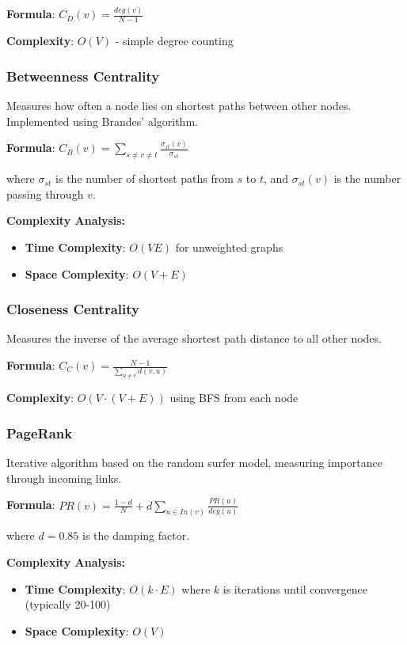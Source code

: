 \documentclass[12pt,a4paper]{article}
\begin{document}
\textbf{Formula}: $C_D(v) = \frac{deg(v)}{N-1}$

\textbf{Complexity}: $O(V)$ - simple degree counting

\subsubsection{Betweenness Centrality}
Measures how often a node lies on shortest paths between other nodes. Implemented using Brandes' algorithm.

\textbf{Formula}: $C_B(v) = \sum_{s \neq v \neq t} \frac{\sigma_{st}(v)}{\sigma_{st}}$

where $\sigma_{st}$ is the number of shortest paths from $s$ to $t$, and $\sigma_{st}(v)$ is the number passing through $v$.

\textbf{Complexity Analysis:}
\begin{itemize}
    \item \textbf{Time Complexity}: $O(VE)$ for unweighted graphs
    \item \textbf{Space Complexity}: $O(V + E)$
\end{itemize}

\subsubsection{Closeness Centrality}
Measures the inverse of the average shortest path distance to all other nodes.

\textbf{Formula}: $C_C(v) = \frac{N-1}{\sum_{u \neq v} d(v,u)}$

\textbf{Complexity}: $O(V \cdot (V + E))$ using BFS from each node

\subsubsection{PageRank}
Iterative algorithm based on the random surfer model, measuring importance through incoming links.

\textbf{Formula}: $PR(v) = \frac{1-d}{N} + d \sum_{u \in In(v)} \frac{PR(u)}{deg(u)}$

where $d = 0.85$ is the damping factor.

\textbf{Complexity Analysis:}
\begin{itemize}
    \item \textbf{Time Complexity}: $O(k \cdot E)$ where $k$ is iterations until convergence (typically 20-100)
    \item \textbf{Space Complexity}: $O(V)$
\end{itemize}
\end{document}
